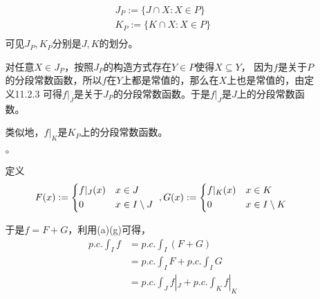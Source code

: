 \documentclass{article}
\begin{document}
\begin{itemize}
\begin{itemize}
                \begin{align*}
                  J_P := \{J \cap X: X \in P\} \\
                  K_P := \{K \cap X: X \in P\} \\
                \end{align*}
                可见$J_P, K_P$分别是$J, K$的划分。

                对任意$X \in J_P$，按照$J_P$的构造方式存在$Y \in P$使得$X \subseteq Y$，
                因为$f$是关于$P$的分段常数函数，所以$f$在$Y$上都是常值的，那么在$X$上也是常值的，由定义11.2.3
                可得$f|_J$是关于$J_P$的分段常数函数。于是$f|_J$是$J$上的分段常数函数。

                类似地，$f|_K$是$K_P$上的分段常数函数。

          \item[$\circ$]

                定义
                \begin{equation*}
                  F(x) :=
                  \begin{cases*}
                    f|_J(x) & $x \in J$             \\
                    0      & $x \in I \setminus J$
                  \end{cases*}
                  ,G(x) :=
                  \begin{cases*}
                    f|_K(x) & $x \in K$             \\
                    0       & $x \in I \setminus K$
                  \end{cases*}
                \end{equation*}

                于是$f = F + G$，利用(a)(g)可得，
                \begin{align*}
                  p.c.\int_{I} f & = p.c.\int_{I} (F + G)                  \\
                                 & = p.c.\int_{I} F + p.c.\int_{I} G       \\
                                 & = p.c.\int_{J} f|_J + p.c.\int_{K} f|_K \\
                \end{align*}
        \end{itemize}
\end{itemize}
\end{document}
